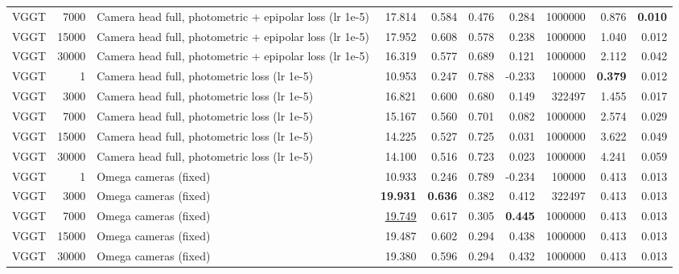 \begin{table}[H]
\begin{tabular}{lrlrrrrrrr}
VGGT & 7000 & Camera head full, photometric + epipolar loss (lr 1e-5) & 17.814 & 0.584 & 0.476 & 0.284 & 1000000 & 0.876 & \textbf{0.010} \\
VGGT & 15000 & Camera head full, photometric + epipolar loss (lr 1e-5) & 17.952 & 0.608 & 0.578 & 0.238 & 1000000 & 1.040 & 0.012 \\
VGGT & 30000 & Camera head full, photometric + epipolar loss (lr 1e-5) & 16.319 & 0.577 & 0.689 & 0.121 & 1000000 & 2.112 & 0.042 \\
VGGT & 1 & Camera head full, photometric loss (lr 1e-5) & 10.953 & 0.247 & 0.788 & -0.233 & 100000 & \textbf{0.379} & 0.012 \\
VGGT & 3000 & Camera head full, photometric loss (lr 1e-5) & 16.821 & 0.600 & 0.680 & 0.149 & 322497 & 1.455 & 0.017 \\
VGGT & 7000 & Camera head full, photometric loss (lr 1e-5) & 15.167 & 0.560 & 0.701 & 0.082 & 1000000 & 2.574 & 0.029 \\
VGGT & 15000 & Camera head full, photometric loss (lr 1e-5) & 14.225 & 0.527 & 0.725 & 0.031 & 1000000 & 3.622 & 0.049 \\
VGGT & 30000 & Camera head full, photometric loss (lr 1e-5) & 14.100 & 0.516 & 0.723 & 0.023 & 1000000 & 4.241 & 0.059 \\
VGGT & 1 & Omega cameras (fixed) & 10.933 & 0.246 & 0.789 & -0.234 & 100000 & 0.413 & 0.013 \\
VGGT & 3000 & Omega cameras (fixed) & \textbf{19.931} & \textbf{0.636} & 0.382 & 0.412 & 322497 & 0.413 & 0.013 \\
VGGT & 7000 & Omega cameras (fixed) & \underline{19.749} & 0.617 & 0.305 & \textbf{0.445} & 1000000 & 0.413 & 0.013 \\
VGGT & 15000 & Omega cameras (fixed) & 19.487 & 0.602 & 0.294 & 0.438 & 1000000 & 0.413 & 0.013 \\
VGGT & 30000 & Omega cameras (fixed) & 19.380 & 0.596 & 0.294 & 0.432 & 1000000 & 0.413 & 0.013 \\
\bottomrule
\end{tabular}
\end{table}